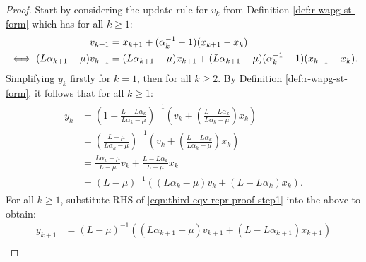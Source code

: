 \documentclass[12pt]{article}
\begin{document}
        \begin{proof}
            Start by considering the update rule for $v_k$ from Definition \ref{def:r-wapg-st-form} which has for all $k \ge 1$:
            \begin{align}
                v_{k + 1} &=
                x_{k + 1} + (\alpha_k^{-1} - 1)(x_{k + 1} - x_k)
                \notag
                \\
                \iff
                (L \alpha_{k + 1} - \mu)v_{k + 1}
                &=
                (L \alpha_{k + 1} - \mu)x_{k + 1} + (L\alpha_{k + 1} - \mu)(\alpha_k^{-1} - 1)(x_{k + 1} - x_k).
                \label{eqn:third-eqv-repr-proof-step1}
            \end{align}
            Simplifying $y_k$ firstly for $k = 1$, then for all $k \ge 2$.
            By Definition \ref{def:r-wapg-st-form}, it follows that for all $k \ge 1$:
            \begin{align}\label{eqn:third-eqv-repr-proof-step2}
                \begin{split}
                    y_k &=
                    \left(
                        1 + \frac{L - L\alpha_k}{L\alpha_k - \mu}
                    \right)^{-1}
                    \left(
                        v_k +
                        \left(\frac{L - L\alpha_k}{L\alpha_k - \mu} \right) x_k
                    \right)
                    \\
                    &=
                    \left(
                    \frac{L - \mu}{L\alpha_k - \mu}
                    \right)^{-1}
                    \left(
                        v_k +
                        \left(\frac{L - L\alpha_k}{L\alpha_k - \mu} \right) x_k
                    \right)
                    \\
                    &=
                    \frac{L\alpha_k - \mu}{L - \mu} v_k
                    +
                    \frac{L - L \alpha_k}{L - \mu} x_k
                    \\
                    &= (L - \mu)^{-1}((L \alpha_k - \mu)v_k + (L - L \alpha_k)x_k).
                \end{split}
            \end{align}
            For all $k\ge 1$, substitute RHS of \eqref{eqn:third-eqv-repr-proof-step1} into the above to obtain:
            {\small
            \begin{align*}
                y_{k + 1} &=
                (L - \mu)^{-1}((L\alpha_{k + 1} - \mu)v_{k + 1} + (L - L \alpha_{k + 1})x_{k + 1})
                \\

\end{align*}}
\end{proof}
\end{document}
